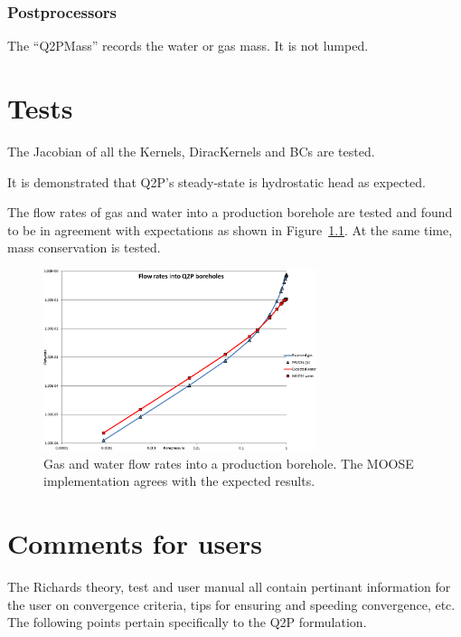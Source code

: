 \documentclass[]{scrreprt}
\begin{document}
\subsection{Postprocessors}

The ``Q2PMass'' records the water or gas mass.  It is not lumped.



\chapter{Tests}

The Jacobian of all the Kernels, DiracKernels and BCs are tested.

It is demonstrated that Q2P's steady-state is hydrostatic head as
expected.

The flow rates of gas and water into a production borehole are tested
and found to be in agreement with expectations as shown in
Figure~\ref{bh.fig}.  At the same time, mass conservation is tested.

\begin{figure}[htb]
\centering
\includegraphics[width=8cm]{bh.eps}
\caption{Gas and water flow rates into a production borehole.  The
  MOOSE implementation agrees with the expected results.}
\label{bh.fig}
\end{figure}




\chapter{Comments for users}

The Richards theory, test and user manual all contain pertinant
information for the user on convergence criteria, tips for ensuring
and speeding convergence, etc.  The following points pertain
specifically to the Q2P formulation.
\end{document}
